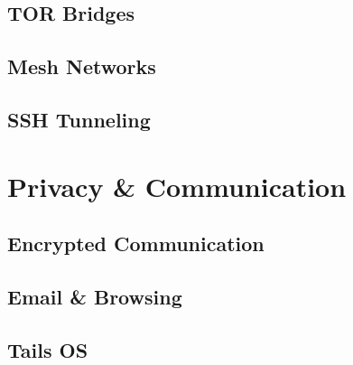 \subsection{TOR Bridges}
\subsection{Mesh Networks}
\subsection{SSH Tunneling}


\section{Privacy \& Communication}

\subsection{Encrypted Communication}
\subsection{Email \& Browsing}
\subsection{Tails OS}



